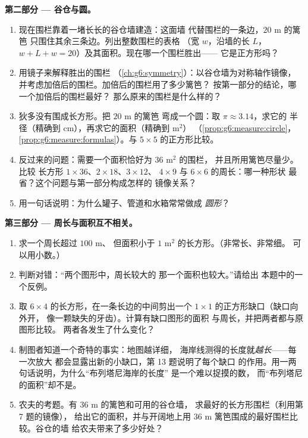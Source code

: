 \begin{problem}
\medskip
\noindent\textbf{第二部分 --- 谷仓与圆。}
\begin{enumerate}[resume]
  \item 现在围栏靠着一堵长长的谷仓墙建造：这面墙
        代替围栏的一条边，$20$ m 的篱笆
        只围住其余三条边。列出整数围栏的表格
        （宽 $w$，沿墙的长 $L$，
        $w + L + w = 20$）及其面积。现在哪一个围栏胜出——
        它是正方形吗？
  \item 用镜子来解释胜出的围栏
        （\cref{ch:g6:symmetry}）：以谷仓墙为对称轴作镜像，
        并考虑加倍后的围栏。加倍后的围栏用了多少篱笆？
        按第一部分的结论，哪一个加倍后的围栏最好？
        那么原来的围栏是什么样的？
  \item 狄多没有围成长方形。把 $20$ m 的篱笆
        弯成一个圆：取 $\pi \approx 3.14$，求它的
        半径（精确到 cm），再求它的面积（精确到 m$^2$）
        （\cref{prop:g6:measure:circle}，
        \cref{prop:g6:measure:formulas}）。与
        $5 \times 5$ 的正方形比较。
  \item 反过来的问题：需要一个面积恰好为 $36$ m$^2$ 的围栏，
        并且所用篱笆尽量少。比较
        长方形 $1 \times 36$、$2 \times 18$、$3 \times 12$、
        $4 \times 9$ 与 $6 \times 6$ 的周长：哪一种形状
        最省？这个问题与第一部分构成怎样的
        镜像关系？
  \item 用一句话说明：为什么罐子、管道和水箱常常做成
        \emph{圆形}？
\end{enumerate}

\medskip
\noindent\textbf{第三部分 --- 周长与面积互不相关。}
\begin{enumerate}[resume]
  \item 求一个周长超过 $100$ m、
        但面积小于 $1$ m$^2$ 的长方形。（非常长、非常细。
        可以用小数。）
  \item 判断对错：“两个图形中，周长较大的
        那一个面积也较大。”请给出
        本题中的一个反例。
  \item 取 $6 \times 4$ 的长方形，在一条长边的中间剪出一个 $1 \times 1$
        的正方形缺口（缺口向外开，
        像一颗缺失的牙齿）。计算有缺口图形的面积
        与周长，并把两者都与原图形比较。
        两者各发生了什么变化？
  \item 制图者知道一个奇特的事实：地图越详细，
        海岸线测得的长度就\emph{越长}——每一次放大
        都会显露出新的小缺口，第 13 题说明了每个缺口
        的作用。用一两句话说明，为什么“布列塔尼海岸的长度”
        是一个难以捉摸的数，
        而“布列塔尼的面积”却不是。
  \item 农夫的考题。有 $36$ m 的篱笆和可用的谷仓墙，
        求最好的长方形围栏（利用第 7 题的镜像），
        给出它的面积，并与开阔地上用
        $36$ m 篱笆围成的最好围栏比较。谷仓的墙
        给农夫带来了多少好处？
\end{enumerate}
\end{problem}

